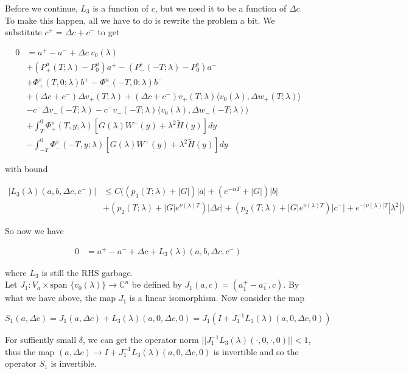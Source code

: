 \documentclass[12pt]{article}
\def\C{{\mathbb C}}
\begin{document}
\begin{enumerate}
Before we continue, $L_3$ is a function of $c$, but we need it to be a function of $\Delta c$. To make this happen, all we have to do is rewrite the problem a bit. We substitute $c^+ = \Delta c + c^-$ to get

\begin{align*}
0 &= a^+ - a^- + \Delta c \: v_0(\lambda) \\
&+ (P^u_+(T; \lambda) - P_0^u)a^+ - (P^s_-(-T; \lambda) - P_0^s)a^- \\
&+ \Phi^s_+(T, 0; \lambda)b^+ - \Phi^u_-(-T, 0; \lambda)b^- \\
&+ (\Delta c + c^-) \Delta v_+(T; \lambda) + (\Delta c + c^-) v_+(T; \lambda) \langle v_0(\lambda), \Delta w_+(T; \lambda) \rangle \\
&- c^- \Delta v_-(-T; \lambda) - c^- v_-(-T; \lambda) \langle v_0(\lambda), \Delta w_-(-T; \lambda) \rangle \\
&+ \int_{T}^0 \Phi^s_+(T, y; \lambda) [ G(\lambda)W^-(y) + \lambda^2 \tilde{H}(y) ] dy \\
&- \int_{-T}^0 \Phi^s_-(-T, y; \lambda) [ G(\lambda)W^+(y) + \lambda^2 \tilde{H}(y) ] dy
\end{align*}

with bound

\begin{align*}
|L_3(\lambda)(a, b, \Delta c, c^-)| &\leq C ( (p_1(T; \lambda) + |G|)|a| + (e^{-\alpha T} + |G|)|b| \\
&+ ( p_2(T; \lambda) + |G|e^{\nu(\lambda)T})|\Delta c| + ( p_2(T; \lambda) + |G|e^{\nu(\lambda)T})|c^-|+ e^{-|\nu(\lambda)|T} |\lambda^2| )
\end{align*}

So now we have 

\begin{align*}
0 &= a^+ - a^- + \Delta c + L_3(\lambda)(a, b, \Delta c, c^-)
\end{align*}

where $L_3$ is still the RHS garbage.\\

Let $J_1: V_a \times \text{span }\{v_0(\lambda)\} \rightarrow \C^n$ be defined by $J_1(a, c) = (a_1^+ - a_1^-, c)$. By what we have above, the map $J_1$ is a linear isomorphism. Now consider the map

\[
S_1(a, \Delta c) = J_1 (a, \Delta c) + L_3(\lambda)(a, 0, \Delta c, 0) = J_1( I + J_1^{-1} L_3(\lambda)(a, 0, \Delta c, 0) )
\]


For suffiently small $\delta$, we can get the operator norm $||J_1^{-1} L_3(\lambda)(\cdot, 0, \cdot, 0)|| < 1$, thus the map $(a, \Delta c) \rightarrow I + J_1^{-1} L_3(\lambda)(a, 0, \Delta c, 0)$ is invertible and so the operator $S_1$ is invertible.\\


\end{enumerate}
\end{document}
